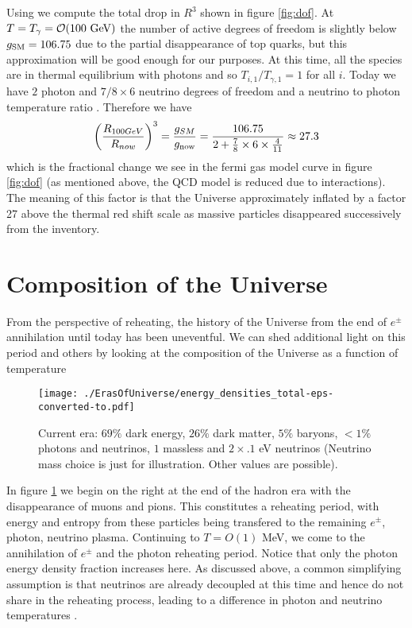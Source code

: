 Using   we  compute the total drop in $R^3$ shown in figure \ref{fig:dof}.  At $T=T_\gamma=\mathcal{O}(100\text{ GeV})$ the number of active degrees of freedom is slightly below $g_{\rm SM}=106.75$ due to the partial disappearance of top quarks, but this approximation will be good enough for our purposes.  At this time, all the species are in thermal equilibrium with photons and so $T_{i,1}/T_{\gamma,1}=1$ for all $i$.  Today we have $2$ photon and $7/8\times 6$ neutrino degrees of freedom and a  neutrino to photon temperature ratio .  Therefore we have
\begin{equation}
\left(\frac{R_{100GeV}}{R_{now}}\right)^3= \frac{g_{SM}}{g_{\rm now}}=\frac{106.75}{2+\frac{7}{8}\times 6\times \frac{4}{11}}\approx 27.3
\end{equation}
which is the  fractional change we see in the fermi gas model curve in figure \ref{fig:dof} (as mentioned above, the QCD model is reduced due to interactions). The meaning of this factor is that the Universe approximately inflated by a factor 27 above the thermal red shift scale as massive particles disappeared successively from the inventory. 


\section{Composition of the Universe}
From the perspective of reheating, the history of the Universe from the end of $e^\pm$ annihilation until today has been uneventful.  We can shed additional light on this period and others by looking at the composition of the Universe as a function of temperature

\begin{figure}
\centerline{\hspace*{0.4cm}\texttt{[image: ./ErasOfUniverse/energy\_densities\_total-eps-converted-to.pdf]}}\label{fig:energy_frac}
\caption{Current era: $69\%$ dark energy, $26\%$ dark matter, $5\%$ baryons, $<1\%$ photons and neutrinos, $1$ massless and $2\times .1$ eV neutrinos (Neutrino mass choice is just for illustration.  Other values are possible).}
 \end{figure}
In figure \ref{fig:energy_frac} we begin on the right at the end of the hadron era with the disappearance of muons and pions.  This constitutes a reheating period, with energy and entropy from these particles being transfered to the remaining $e^\pm$, photon, neutrino plasma.  Continuing to $T=O(1)$ MeV, we come to the annihilation  of $e^\pm$ and the photon reheating period.  Notice that only the photon energy density fraction increases here.  As discussed above, a common simplifying assumption is that neutrinos are already decoupled at this time and hence do not share in the reheating process, leading to a difference in photon and neutrino temperatures .

